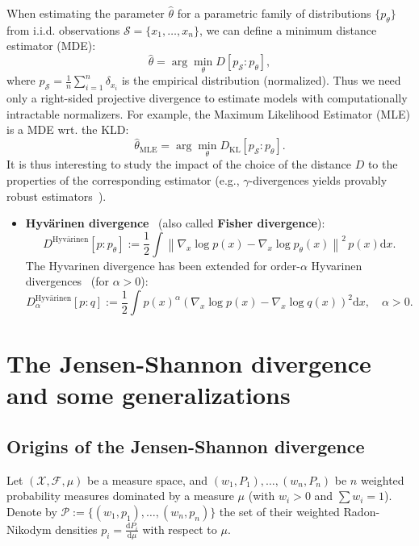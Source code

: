 \documentclass[11pt]{article}
\def\dmu{\mathrm{d}\mu}
\def\calX{\mathcal{X}}
\def\KL{\mathrm{KL}}
\def\calS{\mathcal{S}}
\def\calX{\mathcal{X}}
\def\calF{\mathcal{F}}
\def\calP{\mathcal{P}}
\def\dmu{\mathrm{d}\mu}
\def\KL{\mathrm{KL}}
\begin{document}
When estimating the parameter $\hat\theta$ for a parametric family of distributions $\{p_\theta\}$ from i.i.d. observations $\calS=\{x_1,\ldots,x_n\}$, we can define a minimum distance estimator (MDE):
$$
\hat\theta=\arg\min_\theta D[p_\calS:p_\theta],
$$
where $p_\calS=\frac{1}{n}\sum_{i=1}^n \delta_{x_i}$ is the empirical distribution (normalized).
Thus we need only a right-sided projective divergence to estimate models with computationally intractable normalizers.
For example, the Maximum Likelihood Estimator (MLE) is a MDE wrt. the KLD:
$$
\hat\theta_{\mathrm{MLE}}=\arg\min_\theta D_\KL[p_\calS:p_\theta].
$$
It is thus interesting to study the impact of the choice of the distance $D$ to the properties of the corresponding estimator (e.g., $\gamma$-divergences yields provably robust estimators~\cite{gammadivergence-2008}).



\begin{itemize}
	\item {\bf Hyv\"arinen divergence}~\cite{hyvarinen2005estimation} (also called {\bf Fisher divergence}):
	$$
	D^{\mbox{Hyv\"arinen}}\left[p: p_{\theta}\right]:=\frac{1}{2} \int\left\|\nabla_{x} \log p(x)-\nabla_{x} \log p_{\theta}(x)\right\|^{2}\, p(x) \mathrm{d} x.
	$$
	The Hyvarinen divergence has been extended for order-$\alpha$ Hyvarinen divergences~\cite{nielsen2021fast} (for $\alpha>0$):
	$$
	D^{\mbox{Hyv\"arinen}}_{\alpha}[p: q]:=\frac{1}{2} \int p(x)^{\alpha} \left(\nabla_{x} \log p(x)-\nabla_{x} \log q(x)\right)^{2} \mathrm{d} x, \quad \alpha>0 .
	$$
	
\end{itemize}


\section{The Jensen-Shannon divergence and some generalizations}

\subsection{Origins of the Jensen-Shannon divergence}

Let $(\calX,\calF,\mu)$ be a measure space, and $(w_1,P_1),\ldots, (w_n,P_n)$ be $n$ weighted probability measures dominated 
by a measure $\mu$ (with $w_i>0$ and $\sum w_i=1$). 
Denote by $\calP:=\{(w_1,p_1),\ldots,  (w_n,p_n)\}$ the set of their weighted Radon-Nikodym densities $p_i=\frac{\mathrm{d}P_i}{\dmu}$ with respect to $\mu$.
\end{document}

